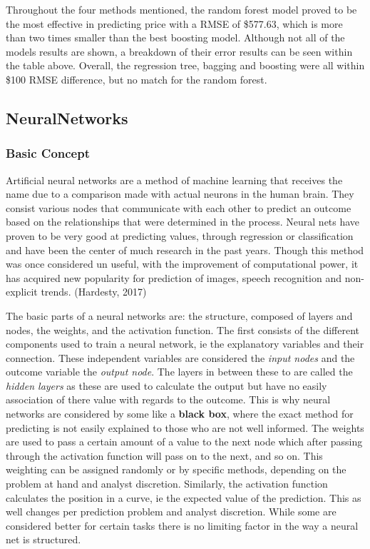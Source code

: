 \documentclass[
  paper=a4,
  ,captions=tableheading
]{scrartcl}
\begin{document}
Throughout the four methods mentioned, the random forest model proved to
be the most effective in predicting price with a RMSE of \$577.63, which
is more than two times smaller than the best boosting model. Although
not all of the models results are shown, a breakdown of their error
results can be seen within the table above. Overall, the regression
tree, bagging and boosting were all within \$100 RMSE difference, but no
match for the random forest.

\hypertarget{neuralnetworks}{%
\subsection{NeuralNetworks}\label{neuralnetworks}}

\hypertarget{basic-concept}{%
\subsubsection{Basic Concept}\label{basic-concept}}

Artificial neural networks are a method of machine learning that
receives the name due to a comparison made with actual neurons in the
human brain. They consist various nodes that communicate with each other
to predict an outcome based on the relationships that were determined in
the process. Neural nets have proven to be very good at predicting
values, through regression or classification and have been the center of
much research in the past years. Though this method was once considered
un useful, with the improvement of computational power, it has acquired
new popularity for prediction of images, speech recognition and
non-explicit trends. (Hardesty, 2017)

The basic parts of a neural networks are: the structure, composed of
layers and nodes, the weights, and the activation function. The first
consists of the different components used to train a neural network, ie
the explanatory variables and their connection. These independent
variables are considered the \emph{input nodes} and the outcome variable
the \emph{output node}. The layers in between these to are called the
\emph{hidden layers} as these are used to calculate the output but have
no easily association of there value with regards to the outcome. This
is why neural networks are considered by some like a \textbf{black box},
where the exact method for predicting is not easily explained to those
who are not well informed. The weights are used to pass a certain amount
of a value to the next node which after passing through the activation
function will pass on to the next, and so on. This weighting can be
assigned randomly or by specific methods, depending on the problem at
hand and analyst discretion. Similarly, the activation function
calculates the position in a curve, ie the expected value of the
prediction. This as well changes per prediction problem and analyst
discretion. While some are considered better for certain tasks there is
no limiting factor in the way a neural net is structured.
\end{document}
